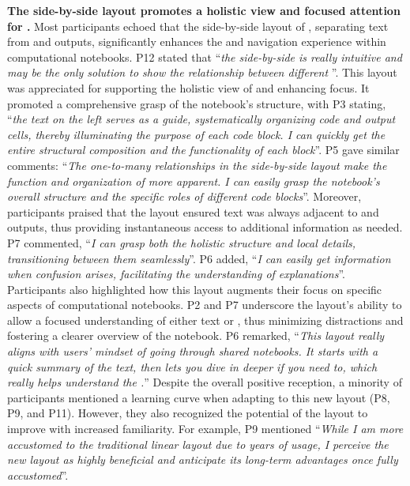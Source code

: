 \textbf{The side-by-side layout promotes a holistic view and focused attention for .}
Most participants echoed that the side-by-side layout of \tool, separating text from  and outputs, significantly enhances the  and navigation experience  within computational notebooks. 
P12 stated that ``\textit{the side-by-side  is really intuitive and may be the only solution to show the relationship between different }''.
This layout was appreciated for supporting the holistic view of  and enhancing focus.
It promoted a comprehensive grasp of the notebook's structure, with P3 stating, ``\textit{the text on the left serves as a guide, systematically organizing code and output cells, thereby illuminating the purpose of each code block. 
I can quickly get the entire structural composition and the functionality of each block}''.
P5 gave similar comments: ``\textit{The one-to-many relationships in the side-by-side layout make the function and organization of   more apparent.
I can easily grasp the notebook's overall structure and the specific roles of different code blocks}''.
Moreover, participants praised that the layout ensured text was always adjacent to  and outputs, thus providing instantaneous access to additional information as needed.
P7 commented, ``\textit{I can grasp both the holistic structure and local details, transitioning between them seamlessly}''.
P6 added, ``\textit{I can easily get information when confusion arises, facilitating the understanding of explanations}''.
Participants also highlighted how this layout augments their focus on specific aspects of computational notebooks.
P2 and P7 underscore the layout's ability to allow a focused understanding of either text or , thus minimizing distractions and fostering a clearer overview of the notebook.
P6 remarked, ``\textit{This layout really aligns with users' mindset of going through shared notebooks. It starts with a quick summary of the text,  then lets you dive in deeper if you need to, which really helps understand the .}''
Despite the overall positive reception, 
a minority of participants mentioned a learning curve when adapting to this new layout (P8, P9, and P11). 
However, they also recognized the potential of the layout to improve  with increased familiarity.
For example, P9 mentioned ``\textit{While I am more accustomed to the traditional linear layout due to years of usage, I perceive the new layout as highly beneficial and anticipate its long-term advantages once fully accustomed}''.